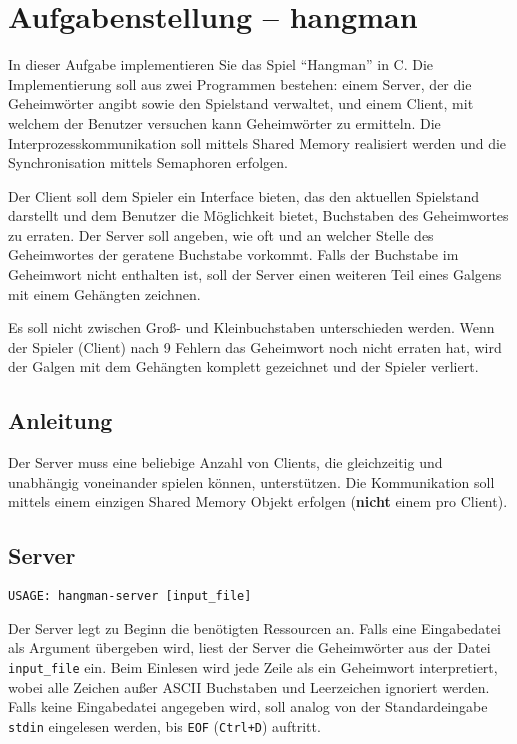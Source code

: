 



\section*{Aufgabenstellung -- hangman}


In dieser Aufgabe implementieren Sie das Spiel "`Hangman"' in C. Die
Implementierung soll aus zwei Programmen bestehen: einem Server, der die
Geheimwörter angibt sowie den Spielstand verwaltet, und einem Client, mit
welchem der Benutzer versuchen kann Geheimwörter zu ermitteln.  Die
Interprozesskommunikation soll mittels Shared Memory realisiert werden
und die Synchronisation mittels Semaphoren erfolgen.


Der Client soll dem Spieler ein Interface bieten, das den aktuellen Spielstand
darstellt und dem Benutzer die Möglichkeit bietet, Buchstaben des Geheimwortes
zu erraten.  Der Server soll angeben, wie oft und an welcher Stelle des
Geheimwortes der geratene Buchstabe vorkommt. Falls der Buchstabe im Geheimwort
nicht enthalten ist, soll der Server einen weiteren Teil eines Galgens mit
einem Gehängten zeichnen.

Es soll nicht zwischen Groß- und Kleinbuchstaben unterschieden werden. Wenn der
Spieler (Client) nach 9 Fehlern das Geheimwort noch nicht erraten hat, wird der
Galgen mit dem Gehängten komplett gezeichnet und der Spieler verliert.

\subsection*{Anleitung} Der Server muss eine beliebige Anzahl von Clients, die
gleichzeitig und unabhängig voneinander spielen können, unterstützen. Die
Kommunikation soll mittels einem einzigen Shared Memory Objekt erfolgen
(\textbf{nicht} einem pro Client).


\subsection*{Server}

\begin{verbatim}
USAGE: hangman-server [input_file]
\end{verbatim}

Der Server legt zu Beginn die benötigten Ressourcen an. Falls eine Eingabedatei
als Argument übergeben wird, liest der Server die Geheimwörter aus der Datei
\verb|input_file| ein. Beim Einlesen wird jede Zeile als ein Geheimwort
interpretiert, wobei alle Zeichen außer ASCII Buchstaben und Leerzeichen
ignoriert werden. Falls keine Eingabedatei angegeben wird, soll analog von der
Standardeingabe \verb|stdin| eingelesen werden, bis \verb|EOF| (\verb|Ctrl+D|)
auftritt.

